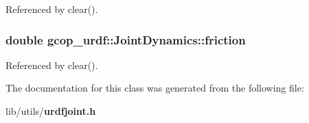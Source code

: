 \-Referenced by clear().

\subsubsection[{friction}]{\setlength{\rightskip}{0pt plus 5cm}double {\bf gcop\-\_\-urdf\-::\-Joint\-Dynamics\-::friction}}\label{classgcop__urdf_1_1JointDynamics_adf162334a08963c85c92df588dcc687c}


\-Referenced by clear().



\-The documentation for this class was generated from the following file\-:\begin{DoxyCompactItemize}
\item 
lib/utils/{\bf urdfjoint.\-h}\end{DoxyCompactItemize}
